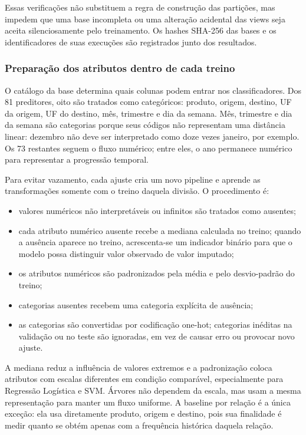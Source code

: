 \documentclass[12pt,a4paper]{article}
\begin{document}
Essas verificações não substituem a regra de construção das partições, mas
impedem que uma base incompleta ou uma alteração acidental das views seja
aceita silenciosamente pelo treinamento. Os hashes SHA-256 das bases e os
identificadores de suas execuções são registrados junto dos resultados.

\subsubsection{Preparação dos atributos dentro de cada treino}

O catálogo da base determina quais colunas podem entrar nos classificadores.
Dos 81 preditores, oito são tratados como categóricos: produto, origem,
destino, UF da origem, UF do destino, mês, trimestre e dia da semana. Mês,
trimestre e dia da semana são categorias porque seus códigos não representam
uma distância linear: dezembro não deve ser interpretado como doze vezes
janeiro, por exemplo. Os 73 restantes seguem o fluxo numérico; entre eles, o
ano permanece numérico para representar a progressão temporal.

Para evitar vazamento, cada ajuste cria um novo pipeline e aprende as
transformações somente com o treino daquela divisão. O procedimento é:

\begin{itemize}
    \item valores numéricos não interpretáveis ou infinitos são tratados como
    ausentes;
    \item cada atributo numérico ausente recebe a mediana calculada no treino;
    quando a ausência aparece no treino, acrescenta-se um indicador binário
    para que o modelo possa distinguir valor observado de valor imputado;
    \item os atributos numéricos são padronizados pela média e pelo
    desvio-padrão do treino;
    \item categorias ausentes recebem uma categoria explícita de ausência;
    \item as categorias são convertidas por codificação one-hot; categorias
    inéditas na validação ou no teste são ignoradas, em vez de causar erro ou
    provocar novo ajuste.
\end{itemize}

A mediana reduz a influência de valores extremos e a padronização coloca
atributos com escalas diferentes em condição comparável, especialmente para
Regressão Logística e SVM. Árvores não dependem da escala, mas usam a mesma
representação para manter um fluxo uniforme. A baseline por relação é a única
exceção: ela usa diretamente produto, origem e destino, pois sua finalidade é
medir quanto se obtém apenas com a frequência histórica daquela relação.
\end{document}
